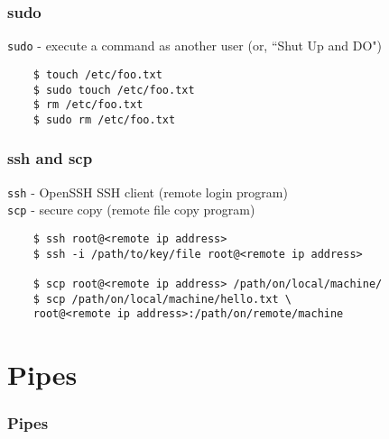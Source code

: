 \documentclass{beamer}
\begin{document}

\begin{frame}[fragile]
\frametitle{sudo}
	\texttt{sudo} - execute a command as another user (or, ``Shut Up and DO")
	\begin{verbatim}
	$ touch /etc/foo.txt
	$ sudo touch /etc/foo.txt
	$ rm /etc/foo.txt
	$ sudo rm /etc/foo.txt
	\end{verbatim}
\end{frame}


\begin{frame}[fragile]
\frametitle{ssh and scp}
	\texttt{ssh} - OpenSSH SSH client (remote login program)
	\\
	\texttt{scp} - secure copy (remote file copy program)
	\begin{verbatim}
	$ ssh root@<remote ip address>
	$ ssh -i /path/to/key/file root@<remote ip address>
	
	$ scp root@<remote ip address> /path/on/local/machine/
	$ scp /path/on/local/machine/hello.txt \
	root@<remote ip address>:/path/on/remote/machine
	\end{verbatim}
\end{frame}

\section{Pipes}

\begin{frame}[fragile]
\frametitle{Pipes}
	\begin{verbatim}
	\end{verbatim}
\end{frame}
\end{document}
